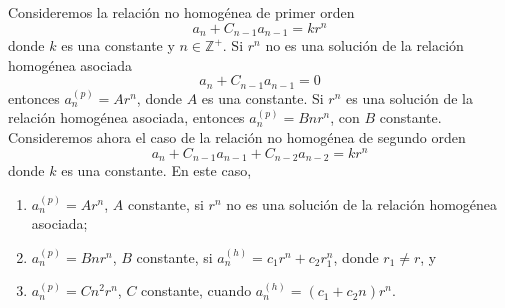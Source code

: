 \begin{BOX}
    Consideremos la relación no homogénea de primer orden
    $$a_n+C_{n-1} a_{n-1}=k r^n$$
    donde $k$ es una constante y $n \in \mathbb{Z}^{+}$. Si $r^n$ no es una solución de la relación homogénea asociada
    $$a_n+C_{n-1} a_{n-1}=0$$
    entonces $a_n^{(p)}=A r^n$, donde $A$ es una constante. Si $r^n$ es una solución de la relación homogénea asociada, entonces $a_n^{(p)}=B n r^n$, con $B$ constante. Consideremos ahora el caso de la relación no homogénea de segundo orden
    $$a_n+C_{n-1} a_{n-1}+C_{n-2} a_{n-2}=k r^n$$
    donde $k$ es una constante. En este caso,
    \begin{enumerate}[label=\alph*)]
        \item $a_n^{(p)}=A r^n$, $A$ constante, si $r^n$ no es una solución de la relación homogénea asociada;
        \item $a_n^{(p)}=B n r^n$, $B$ constante, si $a_n^{(h)}=c_1 r^n+c_2 r_1^n$, donde $r_1 \neq r$, y
        \item $a_n^{(p)}=C n^2 r^n$, $C$ constante, cuando $a_n^{(h)}=\left(c_1+c_2 n\right) r^n$.
    \end{enumerate}
\end{BOX}

\newpage

